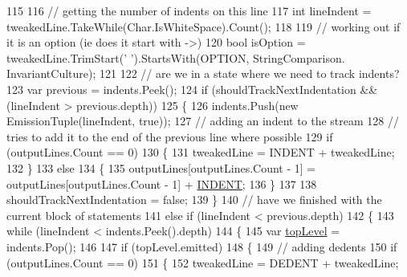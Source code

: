 \begin{DoxyCode}
115 
116                     \textcolor{comment}{// getting the number of indents on this line}
117                     \textcolor{keywordtype}{int} lineIndent = tweakedLine.TakeWhile(Char.IsWhiteSpace).Count();
118 
119                     \textcolor{comment}{// working out if it is an option (ie does it start with ->)}
120                     \textcolor{keywordtype}{bool} isOption = tweakedLine.TrimStart(\textcolor{charliteral}{' '}).StartsWith(OPTION, StringComparison.
      InvariantCulture);
121 
122                     \textcolor{comment}{// are we in a state where we need to track indents?}
123                     var previous = indents.Peek();
124                     \textcolor{keywordflow}{if} (shouldTrackNextIndentation && (lineIndent > previous.depth))
125                     \{
126                         indents.Push(\textcolor{keyword}{new} EmissionTuple(lineIndent, \textcolor{keyword}{true}));
127                         \textcolor{comment}{// adding an indent to the stream}
128                         \textcolor{comment}{// tries to add it to the end of the previous line where possible}
129                         \textcolor{keywordflow}{if} (outputLines.Count == 0)
130                         \{
131                             tweakedLine = INDENT + tweakedLine;
132                         \}
133                         \textcolor{keywordflow}{else}
134                         \{
135                             outputLines[outputLines.Count - 1] = outputLines[outputLines.Count - 1] + 
      \hyperlink{a00321_ae3f2190a793ab77428838e58e0e83676}{INDENT};
136                         \}
137 
138                         shouldTrackNextIndentation = \textcolor{keyword}{false};
139                     \}
140                     \textcolor{comment}{// have we finished with the current block of statements}
141                     \textcolor{keywordflow}{else} \textcolor{keywordflow}{if} (lineIndent < previous.depth)
142                     \{
143                         \textcolor{keywordflow}{while} (lineIndent < indents.Peek().depth)
144                         \{
145                             var \hyperlink{a00321_a8b7e5c0b2c6870eaa8f9454b4f33678b}{topLevel} = indents.Pop();
146 
147                             \textcolor{keywordflow}{if} (topLevel.emitted)
148                             \{
149                                 \textcolor{comment}{// adding dedents}
150                                 \textcolor{keywordflow}{if} (outputLines.Count == 0)
151                                 \{
152                                     tweakedLine = DEDENT + tweakedLine;

\end{DoxyCode}
